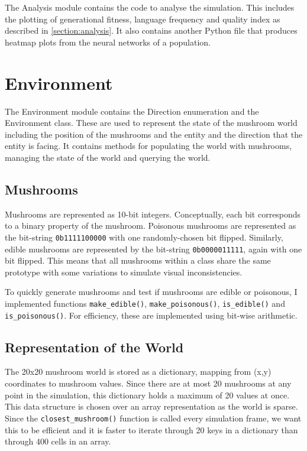 \documentclass[12pt,a4paper,twoside,openright]{report}
\begin{document}
The Analysis module contains the code to analyse the simulation. This includes the plotting of generational fitness, language frequency and quality index as described in \ref{section:analysis}. It also contains another Python file that produces heatmap plots from the neural networks of a population.

\section{Environment}\label{section:impl-env}

The Environment module contains the Direction enumeration and the Environment class. These are used to represent the state of the mushroom world including the position of the mushrooms and the entity and the direction that the entity is facing. It contains methods for populating the world with mushrooms, managing the state of the world and querying the world.

\subsection{Mushrooms}\label{section:mushrooms}

Mushrooms are represented as 10-bit integers. Conceptually, each bit corresponds to a binary property of the mushroom. Poisonous mushrooms are represented as the bit-string \verb!0b1111100000! with one randomly-chosen bit flipped. Similarly, edible mushrooms are represented by the bit-string \verb~0b0000011111~, again with one bit flipped. This means that all mushrooms within a class share the same prototype with some variations to simulate visual inconsistencies. %

To quickly generate mushrooms and test if mushrooms are edible or poisonous, I implemented functions \texttt{make\_edible()}, \texttt{make\_poisonous()}, \texttt{is\_edible()} and \texttt{is\_poisonous()}. For efficiency, these are implemented using bit-wise arithmetic.

\subsection{Representation of the World}

The 20x20 mushroom world is stored as a dictionary, mapping from (x,y) coordinates to mushroom values. Since there are at most 20 mushrooms at any point in the simulation, this dictionary holds a maximum of 20 values at once. This data structure is chosen over an array representation as the world is sparse. Since the \texttt{closest\_mushroom()} function is called every simulation frame, we want this to be efficient and it is faster to iterate through 20 keys in a dictionary than through 400 cells in an array. 
\end{document}
